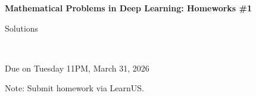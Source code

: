 \documentclass[12pt]{article}
\begin{document}
\begin{center}
{\bf Mathematical Problems in Deep Learning: Homeworks \#1 \begin{solution}Solutions\end{solution}}\\ \medskip
\begin{problem}Due on Tuesday 11PM, March 31, 2026 \end{problem}
\end{center}

\begin{problem}
\noindent 
Note: Submit homework via LearnUS.
\end{problem}

\begin{solution}
\end{solution}
\end{document}
